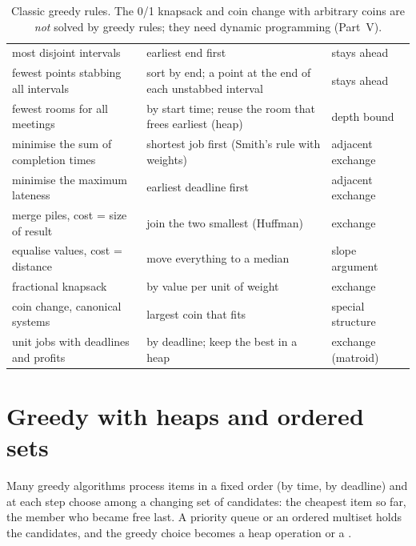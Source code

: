 \begin{table}[htbp]
\centering
\small
\begin{tabular}{@{}P{5.1cm} P{6.2cm} P{3.4cm}@{}}
  \toprule
   &  &  \\
  \midrule
  most disjoint intervals & earliest end first & stays ahead \\
  fewest points stabbing all intervals & sort by end; a point at the end of each unstabbed interval & stays ahead \\
  fewest rooms for all meetings & by start time; reuse the room that frees earliest (heap) & depth bound \\
  minimise the sum of completion times & shortest job first (Smith's rule with weights) & adjacent exchange \\
  minimise the maximum lateness & earliest deadline first & adjacent exchange \\
  merge piles, cost = size of result & join the two smallest (Huffman) & exchange \\
  equalise values, cost = distance & move everything to a median & slope argument \\
  fractional knapsack & by value per unit of weight & exchange \\
  coin change, canonical systems & largest coin that fits & special structure \\
  unit jobs with deadlines and profits & by deadline; keep the best in a heap & exchange (matroid) \\
  \bottomrule
\end{tabular}
\caption{Classic greedy rules. The 0/1 knapsack and coin change with arbitrary coins are \emph{not} solved by greedy rules;
they need dynamic programming (Part~V).}
\label{tab:greedyrules}
\end{table}

\section[Greedy with heaps and ordered sets]{Greedy with heaps and ordered sets \hfill \gold}\label{sec:greedy-ds}

Many greedy algorithms process items in a fixed order (by time, by deadline) and at each step choose among a changing set of
candidates: the cheapest item so far, the member who became free last. A priority queue or an ordered multiset holds the
candidates, and the greedy choice becomes a heap operation or a .


